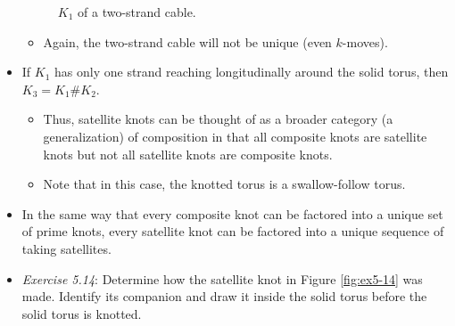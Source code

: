 \documentclass[titlepage]{article}
\numberwithin{figure}{section}
\numberwithin{table}{section}
\numberwithin{equation}{section}
\begin{document}
\begin{itemize}
\begin{figure}[h!]
        \caption{$K_1$ of a two-strand cable.}
        \label{fig:twostrandcable}
    \end{figure}
    \begin{itemize}
        \item Again, the two-strand cable will not be unique (even $k$-moves).
    \end{itemize}
    \item If $K_1$ has only one strand reaching longitudinally around the solid torus, then $K_3=K_1\#K_2$.
    \begin{itemize}
        \item Thus, satellite knots can be thought of as a broader category (a generalization) of composition in that all composite knots are satellite knots but not all satellite knots are composite knots.
        \item Note that in this case, the knotted torus is a swallow-follow torus.
    \end{itemize}
    \item In the same way that every composite knot can be factored into a unique set of prime knots, every satellite knot can be factored into a unique sequence of taking satellites.
    \item \emph{Exercise 5.14}: Determine how the satellite knot in Figure \ref{fig:ex5-14} was made. Identify its companion and draw it inside the solid torus before the solid torus is knotted.

\end{itemize}
\end{document}
